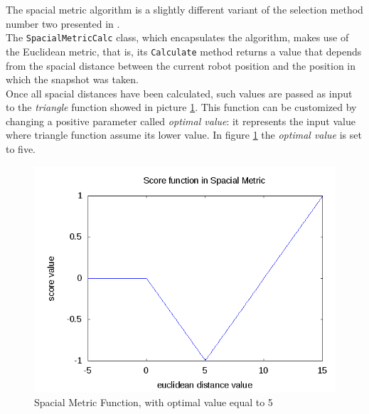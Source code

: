 The spacial metric algorithm is a slightly different variant 
of the selection method number two presented in \cite{sugimoto}.
\\
The \texttt{SpacialMetricCalc} class, which encapsulates 
the algorithm, makes use of the Euclidean metric, that is,
its \texttt{Calculate} method returns a value that 
depends from the spacial distance between the current 
robot position and the position in which the snapshot 
was taken.
\\
Once all spacial distances have been calculated, such values 
are passed as input to the \textit{triangle} function 
showed in picture \ref{fig:spacial_metric_func}. This function
can be customized by changing a positive parameter called
\textit{optimal value}: it represents the input value
where triangle function assume its lower value. In 
figure \ref{fig:spacial_metric_func} the \textit{optimal value}
is set to five.

\begin{figure}[!h]
  \begin{center}
    \includegraphics[width=400pt]{img/spacialMetricFunc.png} 
    \caption{Spacial Metric Function, with optimal value equal to 5}
    \label{fig:spacial_metric_func}
  \end{center}
\end{figure}

